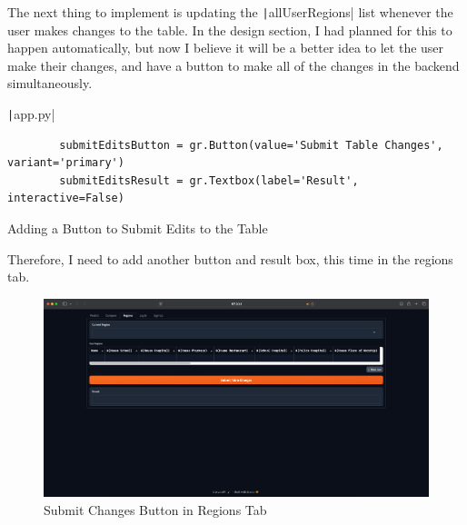\documentclass[12pt]{report}
\newcommand{\pil}[1]{\protect\texttt|#1|}
\begin{document}
\begin{center}
\end{center}

The next thing to implement is updating the \pil{allUserRegions} list whenever the user makes changes to the table. In the design section, I had planned for this to happen automatically, but now I believe it will be a better idea to let the user make their changes, and have a button to make all of the changes in the backend simultaneously.

\begin{listing}[H]
\pil{app.py}
\begin{verbatim}
        submitEditsButton = gr.Button(value='Submit Table Changes', variant='primary')
        submitEditsResult = gr.Textbox(label='Result', interactive=False)
\end{verbatim}
\caption{Adding a Button to Submit Edits to the Table}\label{cs:submitEditsButton}
\end{listing}

Therefore, I need to add another button and result box, this time in the regions tab.

\begin{figure}[H]
\centering
\includegraphics[width=14cm]{ss20.7.png}
\caption{Submit Changes Button in Regions Tab}\label{fig:ss20.7}
\end{figure}
\end{document}
